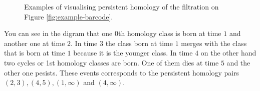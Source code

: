 \begin{figure}[h]
    \caption{Examples of visualising persistent homology of the filtration on Figure \ref{fig:example-barcode}.}%
    \label{fig:example-filtration}%
\end{figure}


You can see in the digram that one 0th homology class is born at time $1$ and another one at time $2$. In time $3$ the class born at time $1$ merges with the class that is born at time $1$ because it is the younger class. In time $4$ on the other hand two cycles or 1st homology classes are born. One of them dies at time $5$ and the other one pesists. These events corresponds to the persistent homology pairs $(2, 3), (4, 5), (1, \infty)$ and $(4, \infty)$.


